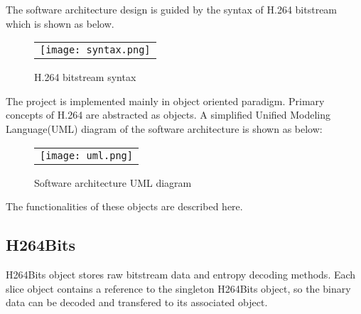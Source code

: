 \documentclass[../main.tex]{subfiles}
\begin{document}
The software architecture design is guided by the syntax of H.264 bitstream which is shown as below.

\begin{figure} [ht]
\begin{center}
\begin{tabular}{c} %
\texttt{[image: syntax.png]}
\end{tabular}
\end{center}
\caption[syntax] 
{ \label{fig:syntax} H.264 bitstream syntax}
\end{figure} 

The project is implemented mainly in object oriented paradigm.
Primary concepts of H.264 are abstracted as objects.
A simplified Unified Modeling Language(UML) diagram of the software architecture is shown as below:

\begin{figure} [ht]
\begin{center}
\begin{tabular}{c} %
\texttt{[image: uml.png]}
\end{tabular}
\end{center}
\caption[uml] 
{ \label{fig:uml} Software architecture UML diagram}
\end{figure} 

The functionalities of these objects are described here.

\subsection{H264Bits}
H264Bits object stores raw bitstream data and entropy decoding methods.
Each slice object contains a reference to the singleton H264Bits object, 
so the binary data can be decoded and transfered to its associated object.

\end{document}
